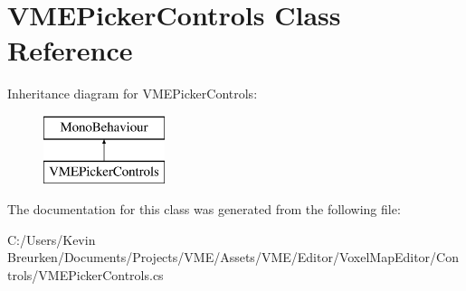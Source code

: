 \hypertarget{class_v_m_e_picker_controls}{}\section{V\+M\+E\+Picker\+Controls Class Reference}
\label{class_v_m_e_picker_controls}
Inheritance diagram for V\+M\+E\+Picker\+Controls\+:\begin{figure}[H]
\begin{center}
\leavevmode
\includegraphics[height=2.000000cm]{class_v_m_e_picker_controls}
\end{center}
\end{figure}


The documentation for this class was generated from the following file\+:\begin{DoxyCompactItemize}
\item 
C\+:/\+Users/\+Kevin Breurken/\+Documents/\+Projects/\+V\+M\+E/\+Assets/\+V\+M\+E/\+Editor/\+Voxel\+Map\+Editor/\+Controls/V\+M\+E\+Picker\+Controls.\+cs\end{DoxyCompactItemize}
